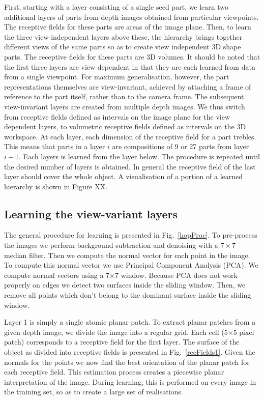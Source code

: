 \documentclass[letterpaper,10pt,conference]{ieeeconf}  %
\begin{document}
First, starting with a layer consisting of a single seed part, we learn two additional layers of parts from depth images obtained from particular viewpoints. The receptive fields for these parts are areas of the image plane. Then, to learn the three view-independent layers above these, the hierarchy brings together different views of the same parts so as to create view independent 3D shape parts. The receptive fields for these parts are 3D volumes. It should be noted that the first three layers are view dependent in that they are each learned from data from a single viewpoint. For maximum generalisation, however, the part representations themselves are view-invariant, achieved by attaching a frame of reference to the part itself, rather than to the camera frame.  The subsequent view-invariant layers are created from multiple depth images. We thus switch from receptive fields defined as intervals on the image plane for the view dependent layers, to volumetric receptive fields defined as intervals on the 3D workspace. At each layer, each dimension of the receptive field for a part trebles. This means that parts in a layer $i$ are compositions of 9 or 27 parts from layer $i-1$.  Each layers is learned from the layer below. The procedure is repeated until the desired number of layers is obtained. In general the receptive field of the last layer should cover the whole object. A visualisation of a portion of a learned hierarchy is shown in Figure XX.  

\subsection{Learning the view-variant layers}

The general procedure for learning is presented in Fig.~\ref{hopProc}. To pre-process the images we perform background subtraction and denoising with a $7 \times 7$ median filter.  Then we compute the normal vector for each point in the image. To compute this normal vector we use Principal Component Analysis (PCA). We compute normal vectors using a 7$\times$7 window. Because PCA does not work properly on edges we detect two surfaces inside the sliding window. Then, we remove all points which don't belong to the dominant surface inside the sliding window.

Layer 1 is simply a single atomic planar patch. To extract planar patches from a given depth image, we divide the image into a regular grid. Each cell (5$\times$5 pixel patch) corresponds to a receptive field for the first layer. The surface of the object as divided into receptive fields is presented in Fig.~\ref{recFields1}. Given the normals for the points we now find the best orientation of the planar patch for each receptive field.  This estimation process creates a piecewise planar interpretation of the image. During learning, this is performed on every image in the training set, so as to create a large set of realisations.
\end{document}
